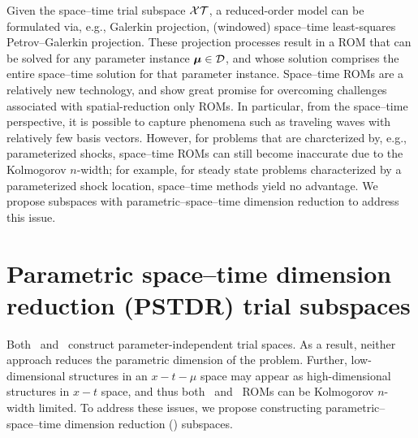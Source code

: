 \documentclass[3p,computermodern,10pt]{elsarticle}
\begin{document}
Given the space--time trial subspace $\mathcal{XT}$, a reduced-order model can be formulated via, e.g., Galerkin projection, (windowed) space--time least-squares Petrov--Galerkin projection. These projection processes result in a ROM that can be solved for any parameter instance $\boldsymbol \mu \in \mathcal{D}$, and whose solution comprises the entire space--time solution for that parameter instance. Space--time ROMs are a relatively new technology, and show great promise for overcoming challenges associated with spatial-reduction only ROMs. In particular, from the space--time perspective, it is possible to capture phenomena such as traveling waves with relatively few basis vectors. However, for problems that are charcterized by, e.g., parameterized shocks, space--time ROMs can still become inaccurate due to the Kolmogorov $n$-width; for example, for steady state problems characterized by a parameterized shock location, space--time methods yield no advantage. We propose subspaces with parametric--space--time dimension reduction to address this issue.




\section{Parametric space--time dimension reduction (PSTDR) trial subspaces}
Both \spatialAcronym\ and \spaceTimeAcronym\ construct parameter-independent trial spaces. As a result, neither approach reduces the parametric dimension of the problem. Further, low-dimensional structures in an $x-t-\mu$ space may appear as high-dimensional structures in $x-t$ space, and thus both \spatialAcronym\ and \spaceTimeAcronym\ ROMs can be Kolmogorov $n$-width limited. To address these issues, we propose constructing parametric--space--time dimension reduction (\parametricSpaceTimeAcronym) subspaces. 
\end{document}
